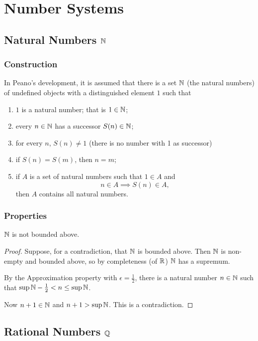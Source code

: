 \chapter{Number Systems}
\section{Natural Numbers $\mathbb N$}
\subsection{Construction}
In Peano's development, it is assumed that there is a set $\mathbb N$ (the natural numbers) of undefined objects with a distinguished element $1$ such that
\begin{enumerate}[label=(\roman*)]
\item $1$ is a natural number; that is $1\in\mathbb N$;
\item every $n\in\mathbb N$ has a successor $S(n)\in\mathbb N$;
\item for every $n$, $S(n)\neq1$ (there is no number with 1 as successor)
\item if $S(n)=S(m)$, then $n=m$;
\item if $A$ is a set of natural numbers such that $1\in A$ and
\[n\in A\implies S(n)\in A,\]
then $A$ contains all natural numbers.
\end{enumerate}

\subsection{Properties}
\begin{theorem}
$\mathbb N$ is not bounded above.
\end{theorem}

\begin{proof}
Suppose, for a contradiction, that $\mathbb N$ is bounded above. Then $\mathbb N$ is non-empty and bounded above, so by completeness (of $\mathbb R$) $\mathbb N$ has a supremum.

By the Approximation property with $\epsilon=\frac{1}{2}$, there is a natural number $n\in\mathbb N$ such that $\sup\mathbb N-\frac{1}{2}<n\le\sup\mathbb N$.

Now $n+1\in\mathbb N$ and $n+1>\sup\mathbb N$. This is a contradiction.
\end{proof}
\pagebreak

\section{Rational Numbers $\mathbb Q$}
